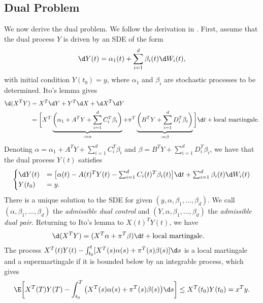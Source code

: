 \subsection{Dual Problem}
We now derive the dual problem. We follow the derivation in \cite{Constrained_Quadratic_Risk_Minimisation_Via_FBSDEs}. First, assume that the dual process $Y$ is driven by an SDE of the form
\begin{equation*}
    \d Y(t) = \alpha_1 (t) + \sum_{i=1}^d \beta_i(t) \d W_i(t),
\end{equation*}
with initial condition $Y(t_0) = y$, where $\alpha_1$ and $\beta_i$ are stochastic processes to be determined. Ito's lemma gives 
\begin{align*}
    \d (X^T Y) &= X^T \d Y + Y^T \d X + \d X^T \d Y\\
    &= \bigg[  X^T \underbrace{\bigg(\alpha_1 + A^T Y + \sum_{i=1}^d C_i^T \beta_i\bigg)}_{:= \alpha} + \pi^T \underbrace{\bigg(B^T Y + \sum_{i=1}^d D_i^T \beta_i\bigg)}_{:= \beta} \bigg] \d t + \text{local martingale}.
\end{align*}
Denoting $\alpha = \alpha_1 + A^T Y + \sum_{i=1}^d C_i^T \beta_i$ and $\beta = B^T Y + \sum_{i=1}^d D_i^T \beta_i$, we have that the dual process $Y(t)$ satisfies
\begin{equation}
    \begin{cases}
        \d Y(t) &= \big[ \alpha(t) - A(t)^T Y(t) - \sum_{i=1}^d C_i(t)^T \beta_i(t)\big]\d t + \sum_{i=1}^d \beta_i(t) \d W_i(t)\\
        Y(t_0) &= y. \label{eq: y_sde}
    \end{cases}
\end{equation}
There is a unique solution to the SDE for given $(y, \alpha, \beta_1, \dots, \beta_d)$. We call $(\alpha, \beta_1, \dots, \beta_d)$ the \textit{admissible dual control} and $(Y, \alpha, \beta_1, \dots, \beta_d)$ the \textit{admissible dual pair}. Returning to Ito's lemma to $X(t)^T Y(t)$, we have
\begin{align*}
    \d (X^T Y) &= (X^T \alpha + \pi^T \beta ) \d t + \text{local martingale}.
\end{align*}
The process $X^T(t)Y(t) - \int_{t_0}^t [X^T(s) \alpha(s) + \pi^T(s) \beta(s)] \d s$ is a local martingale and a supermartingale if it is bounded below by an integrable process, which gives 
\begin{equation}
    \E \bigg[ X^T(T) Y(T) - \int_{t_0}^T \big(X^T(s) \alpha(s) + \pi^T(s) \beta(s) \big) \d s \bigg] \le X^T(t_0) Y(t_0) =  x^T y. \label{eq: dual_1}
\end{equation}
